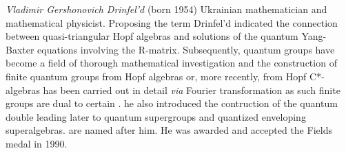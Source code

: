 \documentclass[12pt]{article}
\begin{document}
\emph{Vladimir Gershonovich Drinfel'd} (born 1954) Ukrainian mathematician and mathematical physicist. Proposing the term  Drinfel'd indicated the connection between quasi-triangular Hopf algebras and solutions of the quantum Yang-Baxter equations involving the R-matrix. Subsequently, quantum groups have become a field of thorough mathematical investigation
and the construction of finite quantum groups from Hopf algebras or, more recently, from Hopf C*-algebras
has been carried out in detail {\em via} Fourier transformation as such finite groups are dual to certain 
. he also introduced the contruction of the quantum double leading later
to quantum supergroups and quantized enveloping superalgebras. 
 are named after him. He was awarded and accepted the Fields medal in 1990.
\end{document}
